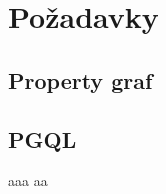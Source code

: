 
\chapter{Požadavky}
\label{requirements}

\section{Property graf}

\section{PGQL}


aaa \citet[Věta 4.22]{Andel07} aa